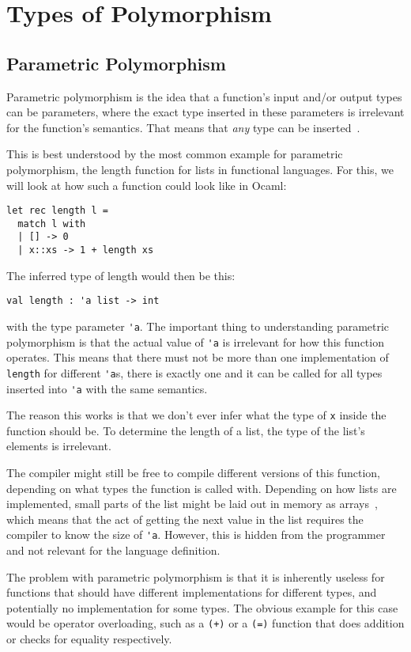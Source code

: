 \section{Types of Polymorphism}

\subsection{Parametric Polymorphism}

Parametric polymorphism is the idea that a function's input and/or output types can be parameters, where the exact type inserted in these parameters is irrelevant for the function's semantics. That means that \textit{any} type can be inserted~\cite[Chapter~23.2]{pierce-types}.

This is best understood by the most common example for parametric polymorphism, the length function for lists in functional languages. For this, we will look at how such a function could look like in Ocaml:
\newpage
\begin{verbatim}
let rec length l =
  match l with
  | [] -> 0
  | x::xs -> 1 + length xs
\end{verbatim}
The inferred type of length would then be this:
\begin{verbatim}
val length : 'a list -> int
\end{verbatim}
with the type parameter \verb|'a|. The important thing to understanding parametric polymorphism is that the actual value of \verb|'a| is irrelevant for how this function operates. This means that there must not be more than one implementation of \verb|length| for different \verb|'a|s, there is exactly one and it can be called for all types inserted into \verb|'a| with the same semantics.

The reason this works is that we don't ever infer what the type of \verb|x| inside the function should be. To determine the length of a list, the type of the list's elements is irrelevant.

The compiler might still be free to compile different versions of this function, depending on what types the function is called with. Depending on how lists are implemented, small parts of the list might be laid out in memory as arrays~\cite{functional-lists}, which means that the act of getting the next value in the list requires the compiler to know the size of \verb|'a|. However, this is hidden from the programmer and not relevant for the language definition.

The problem with parametric polymorphism is that it is inherently useless for functions that should have different implementations for different types, and potentially no implementation for some types. The obvious example for this case would be operator overloading, such as a \verb|(+)| or a \verb|(=)| function that does addition or checks for equality respectively.

